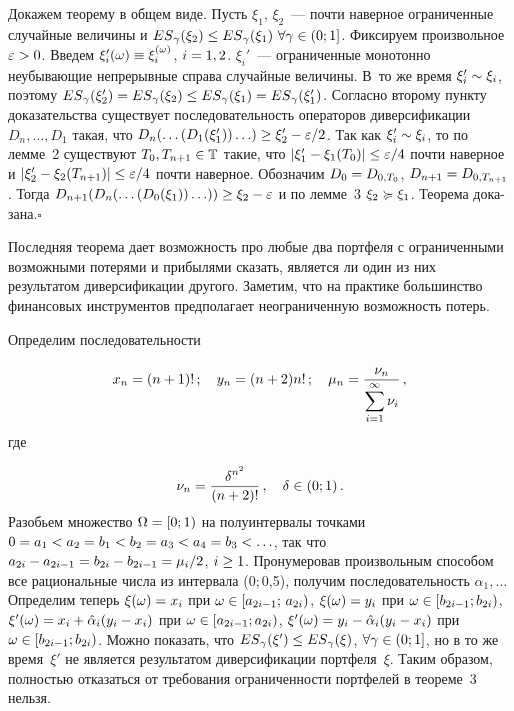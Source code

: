 \begin{multicols}{2}
\noindent
{} Докажем теорему в общем виде. Пусть $\xi_1$, $\xi_2$~---
почти наверное ограниченные случайные величины и
${ES}_\gamma(\xi_2)\hm\le{ES}_\gamma(\xi_1)\ \forall
\gamma\hm\in(0;1]$. Фиксируем произвольное $\eps\hm>0$. Введем
$\xi_i'(\omega) \hm\equiv \xi_i^{(\omega)}$, $i\hm=1,2$. $\xi_i'$~---
ограниченные монотонно неубывающие непрерывные справа случайные
величины. В~то же время $\xi_i'\hm\sim\xi_i$, поэтому
${ES}_\gamma(\xi_2') \hm= {ES}_\gamma(\xi_2) \hm\le {ES}_\gamma(\xi_1) \hm=
{ES}_\gamma(\xi_1')$. Согласно второму пункту доказательства
существует последовательность операторов диверсификации
$D_n,\ldots,D_1$ такая, что
$D_n(\ldots(D_1(\xi_1'))\ldots)\hm\ge\xi_2'\hm-\eps/2$. Так как
$\xi_i'\hm\sim\xi_i$, то по лемме~2 существуют
$T_0,T_{n+1} \hm\in \classT$ такие, что $|\xi_1'\hm-\xi_1(T_0)| \hm\le
\eps/4$ почти наверное и $|\xi_2'\hm-\xi_2(T_{n+1})| \hm\le \eps/4$ почти
наверное. Обозначим $D_0\hm=D_{0,T_0}$, $D_{n+1}\hm=D_{0,T_{n+1}}$. Тогда
$D_{n+1}(D_n(\ldots(D_0(\xi_1))\ldots)) \hm\ge \xi_2 \hm- \eps$ и по лемме~3 
$\xi_2 \succcurlyeq \xi_1$. Теорема дока-\linebreak зана.\hfill$\square$

\smallskip

Последняя теорема дает возможность про любые два портфеля с
ограниченными возможными потерями и прибылями сказать, является ли
один из них результатом диверсификации другого. Заметим, что на
практике большинство финансовых инструментов предполагает
неограниченную возможность потерь.


Определим последовательности

\noindent
$$
x_n=(n+1)!\,;\quad y_n=(n+2)n!\,;\quad
\mu_n=\displaystyle\frac{\displaystyle \nu_n\mathstrut}{\displaystyle \sum\limits_{i=1}^\infty \nu_i\mathstrut}\,,
$$ 
где 

\noindent
$$
\nu_n=\displaystyle\frac{\displaystyle \delta^{n^2}\mathstrut}{\displaystyle (n+2)!\mathstrut}\,,\quad \delta\in (0;1)\,.
$$
Разобьем множество $\Omega\hm=[0;1)$ на полуинтервалы точками
$0\hm=a_1\hm<a_2\hm=b_1\hm<b_2\hm=a_3\hm<a_4\hm=b_3\hm<\ldots$, так что
$a_{2i}\hm-a_{2i-1}\hm=b_{2i}\hm-b_{2i-1}\hm=\mu_i/2$, $i\hm\ge1$. Пронумеровав
произвольным способом все рациональные числа из интервала (0;\,0,5),
получим последовательность $\hat{\alpha}_1,\ldots$ Определим теперь
$\xi(\omega)\hm=x_i$ при $\omega\hm\in[a_{2i-1};\,a_{2i})$,
                                 $\xi(\omega)\hm=y_i$ при $\omega\hm\in[b_{2i-1};b_{2i})$,
                                 $\xi'(\omega)\hm=x_i+\hat{\alpha}_i(y_i-x_i)$ при $\omega\hm\in[a_{2i-1};a_{2i})$,
                                 $\xi'(\omega)\hm=y_i-\hat{\alpha}_i(y_i-x_i)$ при $\omega\hm\in[b_{2i-1};b_{2i})$.
Можно показать, что ${ES}_\gamma(\xi') \hm\le {ES}_\gamma(\xi)$,
$\forall \gamma \hm\in(0;1]$, но в то же время~$\xi'$ не является
результатом диверсификации портфеля~$\xi$. Таким образом,
полностью отказаться от требования ограниченности портфелей в
теореме~3 нельзя.



\end{multicols}
